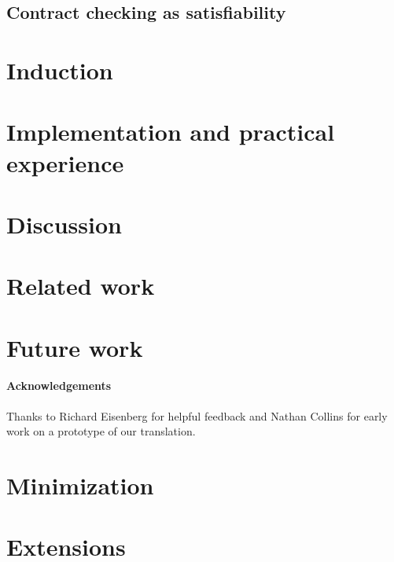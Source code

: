 \documentclass[preprint,nocopyrightspace]{sigplanconf}
\begin{document}
\subsection{Contract checking as satisfiability}\label{sect:soundness}
  

\section{Induction}\label{sect:induction}
  

\section{Implementation and practical experience}\label{sect:implementation}
  

\section{Discussion}\label{sect:discussion}
  

\section{Related work}\label{sect:related}
  

\section{Future work}\label{sect:future}
  

\paragraph{Acknowledgements}
Thanks to Richard Eisenberg for helpful feedback and Nathan Collins
for early work on a prototype of our translation.




\appendix

\section{Minimization}
   

\section{Extensions}
  
\end{document}
